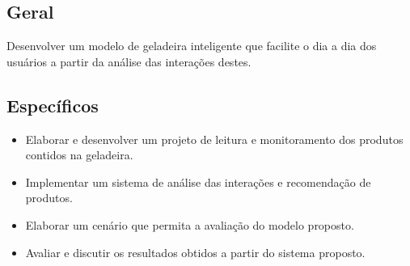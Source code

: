 \subsection{Geral}



Desenvolver um modelo de geladeira inteligente que facilite o dia a dia dos usuários a partir da análise das interações destes.
    

\subsection{Específicos}


\begin{itemize} \parskip -1pt
	\item Elaborar e desenvolver um projeto de leitura e monitoramento dos produtos contidos na geladeira.
	\item Implementar um sistema de análise das interações e recomendação de produtos.
	\item Elaborar um cenário que permita a avaliação do modelo proposto.
	\item Avaliar e discutir os resultados obtidos a partir do sistema proposto.


\end{itemize}

